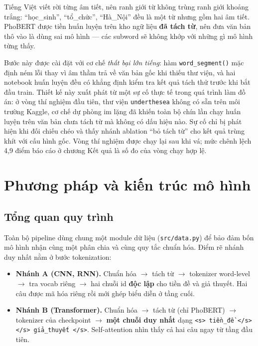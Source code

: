 \documentclass[12pt,a4paper,oneside]{report}
\begin{document}
Tiếng Việt viết rời từng âm tiết, nên ranh giới từ không trùng ranh giới khoảng trắng:
``học\_sinh'', ``tổ\_chức'', ``Hà\_Nội'' đều là một từ nhưng gồm hai âm tiết. PhoBERT được
tiền huấn luyện trên kho ngữ liệu \textbf{đã tách từ}, nên đưa văn bản thô vào là dùng sai
mô hình --- các subword sẽ không khớp với những gì mô hình từng thấy.

Bước này được cài đặt với cơ chế \textit{thất bại lớn tiếng}: hàm \texttt{word\_segment()}
mặc định ném lỗi thay vì âm thầm trả về văn bản gốc khi thiếu thư viện, và hai notebook
huấn luyện đều có khẳng định kiểm tra kết quả tách thử trước khi bắt đầu train. Thiết kế
này xuất phát từ một sự cố thực tế trong quá trình làm đồ án: ở vòng thí nghiệm đầu tiên,
thư viện \texttt{underthesea} không có sẵn trên môi trường Kaggle, cơ chế dự phòng im lặng
đã khiến toàn bộ chín lần chạy huấn luyện trên văn bản chưa tách từ mà không có dấu hiệu
nào. Sự cố chỉ bị phát hiện khi đối chiếu chéo và thấy nhánh ablation ``bỏ tách từ'' cho
kết quả trùng khít với cấu hình gốc. Vòng thí nghiệm được chạy lại sau khi vá; mức chênh
lệch 4,9 điểm báo cáo ở chương Kết quả là số đo của vòng chạy hợp lệ.

\chapter{Phương pháp và kiến trúc mô hình}

\section{Tổng quan quy trình}

Toàn bộ pipeline dùng chung một module dữ liệu (\texttt{src/data.py}) để bảo đảm bốn mô
hình nhận cùng một phân chia và cùng quy tắc chuẩn hóa. Điểm rẽ nhánh duy nhất nằm ở bước
tokenization:

\begin{itemize}[leftmargin=*,itemsep=2pt]
  \item \textbf{Nhánh A (CNN, RNN).} Chuẩn hóa $\rightarrow$ tách từ $\rightarrow$
        tokenizer word-level $\rightarrow$ tra vocab riêng $\rightarrow$ hai chuỗi id
        \textbf{độc lập} cho tiền đề và giả thuyết. Hai câu được mã hóa riêng rồi mới ghép
        biểu diễn ở tầng cuối.
  \item \textbf{Nhánh B (Transformer).} Chuẩn hóa $\rightarrow$ tách từ (chỉ PhoBERT)
        $\rightarrow$ tokenizer của checkpoint $\rightarrow$ \textbf{một chuỗi duy nhất}
        dạng \texttt{<s> tiền\_đề </s></s> giả\_thuyết </s>}. Self-attention nhìn thấy cả
        hai câu ngay từ tầng đầu tiên.
\end{itemize}
\end{document}

